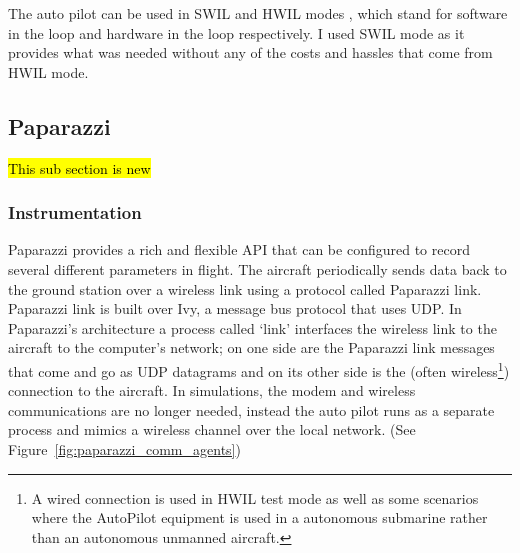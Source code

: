 The auto pilot can be used in SWIL and HWIL modes \cite{melmoth2019true}, which stand for software in the loop and hardware in the loop respectively. I used SWIL mode as it provides what was needed without any of the costs and hassles that come from HWIL mode. 

\subsection{Paparazzi}\label{sec:paparazzi_data_collection}

\hl{This sub section is new}

\subsubsection{Instrumentation}
Paparazzi provides a rich and flexible API that can be configured to record several different parameters in flight. The aircraft periodically sends data back to the ground station over a wireless link using a protocol called Paparazzi link. Paparazzi link is built over Ivy, a message bus protocol that uses UDP. 
In Paparazzi's architecture a process called `link' interfaces the wireless link to the aircraft to the computer's network; on one side are the Paparazzi link messages that come and go as UDP datagrams and on its other side is the (often wireless\footnote{A wired connection is used in HWIL test mode as well as some scenarios where the AutoPilot equipment is used in a autonomous submarine rather than an autonomous unmanned aircraft.}) connection to the aircraft.
In simulations, the modem and wireless communications are no longer needed, instead the auto pilot runs as a separate process and mimics a wireless channel over the local network. (See Figure~\ref{fig:paparazzi_comm_agents})

